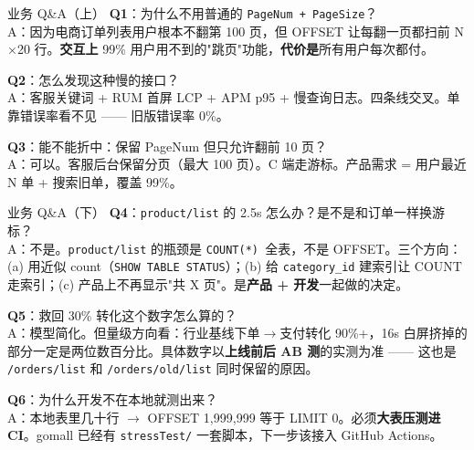 \begin{frame}{业务 Q\&A（上）}
\textbf{Q1}：为什么不用普通的 \texttt{PageNum + PageSize}？\\
\hspace{4mm}\small A：因为电商订单列表用户根本不翻第 100 页，但 OFFSET 让每翻一页都扫前 N$\times$20 行。\textbf{交互上} 99\% 用户用不到的"跳页"功能，\textbf{代价是}所有用户每次都付。

\vspace{2mm}
\textbf{Q2}：怎么发现这种慢的接口？\\
\hspace{4mm}\small A：客服关键词 + RUM 首屏 LCP + APM p95 + 慢查询日志。四条线交叉。单靠错误率看不见 —— 旧版错误率 0\%。

\vspace{2mm}
\textbf{Q3}：能不能折中：保留 PageNum 但只允许翻前 10 页？\\
\hspace{4mm}\small A：可以。客服后台保留分页（最大 100 页）。C 端走游标。产品需求 = 用户最近 N 单 + 搜索旧单，覆盖 99\%。
\end{frame}

\begin{frame}{业务 Q\&A（下）}
\textbf{Q4}：\texttt{product/list} 的 2.5s 怎么办？是不是和订单一样换游标？\\
\hspace{4mm}\small A：不是。\texttt{product/list} 的瓶颈是 \texttt{COUNT(*) }全表，不是 OFFSET。三个方向：(a) 用近似 count（\texttt{SHOW TABLE STATUS}）；(b) 给 \texttt{category\_id} 建索引让 COUNT 走索引；(c) 产品上不再显示"共 X 页"。是\textbf{产品 + 开发}一起做的决定。

\vspace{2mm}
\textbf{Q5}：救回 30\% 转化这个数字怎么算的？\\
\hspace{4mm}\small A：模型简化。但量级方向看：行业基线下单$\to$支付转化 90\%+，16s 白屏挤掉的部分一定是两位数百分比。具体数字以\textbf{上线前后 AB 测}的实测为准 —— 这也是 \texttt{/orders/list} 和 \texttt{/orders/old/list} 同时保留的原因。

\vspace{2mm}
\textbf{Q6}：为什么开发不在本地就测出来？\\
\hspace{4mm}\small A：本地表里几十行 $\to$ OFFSET 1{,}999{,}999 等于 LIMIT 0。必须\textbf{大表压测进 CI}。gomall 已经有 \texttt{stressTest/} 一套脚本，下一步该接入 GitHub Actions。
\end{frame}

